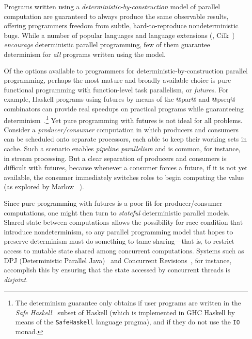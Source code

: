 Programs written using a \emph{deterministic-by-construction} model of
parallel computation are guaranteed to always produce the same
observable results, offering programmers freedom from subtle,
hard-to-reproduce nondeterministic bugs.  While a number of popular
languages and language extensions (\eg, Cilk~\cite{cilk}) \emph{encourage} deterministic parallel programming, few
of them guarantee determinism for \emph{all} programs written using
the model.

Of the options available to programmers for
deterministic-by-construction parallel programming, perhaps the most
mature and broadly available choice is pure functional programming
with function-level task parallelism, or \emph{futures}.  For example,
Haskell programs using futures by means of the @par@ and @pseq@
combinators can provide real speedups on practical programs while
guaranteeing determinism~\cite{marlow-par}.\footnote{The determinism
  guarantee only obtains if user programs are written in the
  \emph{Safe Haskell}~\cite{safe-haskell} subset of Haskell (which is
  implemented in GHC Haskell by means of the \lstinline|SafeHaskell|
  language pragma), and if they do not use the \lstinline|IO| monad.}
Yet pure programming with futures is not ideal for all problems.
Consider a \emph{producer/consumer} computation in which producers and
consumers can be scheduled onto separate processors, each able to keep
their working sets in cache.  Such a scenario enables \emph{pipeline
  parallelism} and is common, for instance, in stream processing.  But
a clear separation of producers and consumers is difficult with
futures, because whenever a consumer forces a future, if it is not yet
available, the consumer immediately switches roles to begin computing
the value (as explored by Marlow \etal~\cite{monad-par}).

Since pure programming with futures is a poor fit for
producer/consumer computations, one might then turn to
{\em stateful} deterministic parallel models.  Shared state between
computations allows the possibility for race condition that introduce
nondeterminism, so any parallel programming model that hopes to
preserve determinism must do something to tame sharing---that is, to
restrict access to mutable state shared among concurrent computations.
Systems such as DPJ (Deterministic Parallel Java)~\cite{dpj-hotpar09}
and Concurrent
Revisions~\cite{concurrent-revisions-oopsla,concurrent-revisions-haskell11},
for instance, accomplish this by ensuring that the state accessed by
concurrent threads is {\em disjoint}.

